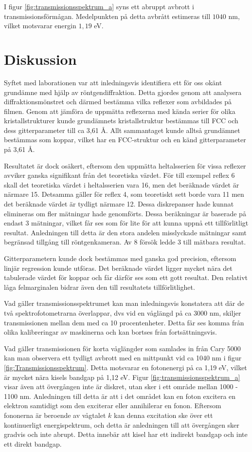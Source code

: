 \documentclass[12pt, a4paper]{article}
\begin{document}
I figur \ref{fig:transmissionsspektrum_a} syns ett abruppt avbrott i transmissionsförmågan. Medelpunkten på detta avbrått estimeras till $1040$ nm, vilket motsvarar energin $1,19$ eV.

\section{Diskussion}
Syftet med laborationen var att inledningsvis identifiera ett för oss okänt grundämne med hjälp av röntgendiffraktion.
Detta gjordes genom att analysera diffraktionsmönstret och därmed bestämma vilka reflexer som avbildades på filmen. 
Genom att jämföra de uppmätta reflexerna med kända serier för olika kristallstrukturer kunde grundämnets kristallstruktur bestämmas till FCC 
och dess gitterparameter till ca 3,61 Å.
Allt sammantaget kunde alltså grundämnet bestämmas som koppar, vilket har en FCC-struktur och en känd gitterparameter på 3,61 Å.

Resultatet är dock osäkert, eftersom den uppmätta heltalsserien för vissa reflexer avviker ganska signifikant från det teoretiska värdet.
För till exempel reflex 6 skall det teoretiska värdet i heltalsserien vara 16, men det beräknade värdet är närmare 15.
Detsamma gäller för reflex 4, som teoretiskt sett borde vara 11 men det beräknade värdet är tydligt närmare 12.
Dessa diskrepanser hade kunnat elimineras om fler mätningar hade genomförts.
Dessa beräkningar är baserade på endast 3 mätningar, vilket får ses som för lite för att kunna uppnå ett tillförlitligt resultat.
Anledningen till detta är den stora andelen misslyckade mätningar samt begränsad tillgång till röntgenkameran.
Av 8 försök ledde 3 till mätbara resultat.

Gitterparametern kunde dock bestämmas med ganska god precision, eftersom linjär regression kunde utföras.
Det beräknade värdet ligger mycket nära det tabulerade värdet för koppar och får därför ses som ett gott resultat.
Den relativt låga felmarginalen bidrar även den till resultatets tillförlitlighet.

Vad gäller transmissionsspektrumet kan man inledningsvis konstatera att där de två spektrofotometrarna överlappar, 
dvs vid en våglängd på ca 3000 nm, skiljer transmissionen mellan dem med ca 10 procentenheter.
Detta får ses komma från olika kalibreringar av maskinerna och kan bortses från fortsättningsvis.

Vad gäller transmissionen för korta våglängder som samlades in från Cary 5000 kan man observera ett tydligt avbrott med en mittpunkt vid ca 1040 nm i figur \ref{fig:Transmissionsspektrum}.
Detta motsvarar en fotonenergi på ca 1,19 eV, vilket är mycket nära kisels bandgap på 1,12 eV.
Figur \ref{fig:transmissionsspektrum_a} visar även att övergången inte är diskret, utan sker i ett område mellan 1000 - 1100 nm.
Anledningen till detta är att i det området kan en foton excitera en elektron samtidigt som den exciterar eller annihilerar en fonon.
Eftersom fononerna är beroende av vågtalet $k$ kan denna excitation ske över ett kontinuerligt energispektrum,
och detta är anledningen till att övergången sker gradvis och inte abrupt.
Detta innebär att kisel har ett indirekt bandgap och inte ett direkt bandgap.
\end{document}
